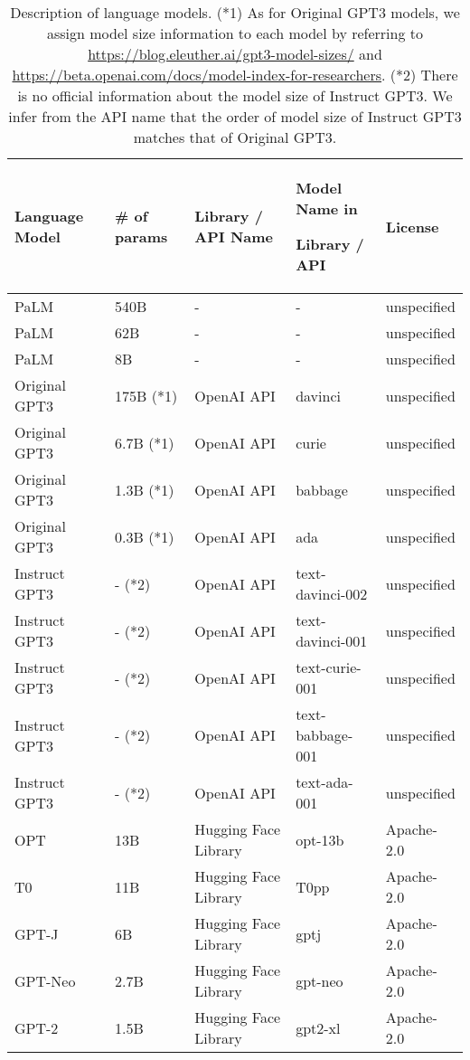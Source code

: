 \begin{table}[h]
\centering
\footnotesize
\caption{Description of language models. (*1) As for Original GPT3 models, we assign model size information to each model by referring to \url{https://blog.eleuther.ai/gpt3-model-sizes/}
and \url{https://beta.openai.com/docs/model-index-for-researchers}. 
(*2) There is no official information about the model size of Instruct GPT3. We infer from the API name that the order of model size of Instruct GPT3 matches that of Original GPT3.}
\label{tab:model_description}
\begin{tabular}{lllll}\toprule
Language Model &\# of params &Library / API Name &Model Name in \par Library / API &License \\\midrule \midrule

PaLM &540B &- &- &unspecified \\
PaLM &62B &- &- &unspecified \\
PaLM &8B &- &- &unspecified \\

\midrule

Original GPT3 &175B (*1) &OpenAI API &davinci &unspecified \\
Original GPT3 &6.7B (*1) &OpenAI API &curie &unspecified \\
Original GPT3 &1.3B (*1) &OpenAI API &babbage &unspecified \\
Original GPT3 &0.3B (*1) &OpenAI API &ada &unspecified \\

\midrule

Instruct GPT3 &- (*2) &OpenAI API &text-davinci-002 &unspecified \\
Instruct GPT3 &- (*2) &OpenAI API &text-davinci-001 &unspecified \\
Instruct GPT3 &- (*2) &OpenAI API &text-curie-001 &unspecified \\
Instruct GPT3 &- (*2) &OpenAI API &text-babbage-001 &unspecified \\
Instruct GPT3 &- (*2) &OpenAI API &text-ada-001 &unspecified \\

\midrule

OPT &13B &Hugging Face Library &opt-13b &Apache-2.0 \\
T0 &11B &Hugging Face Library &T0pp &Apache-2.0 \\
GPT-J &6B &Hugging Face Library &gptj &Apache-2.0 \\
GPT-Neo &2.7B &Hugging Face Library &gpt-neo &Apache-2.0 \\
GPT-2 &1.5B &Hugging Face Library &gpt2-xl &Apache-2.0 \\
\bottomrule
\end{tabular}
\end{table}